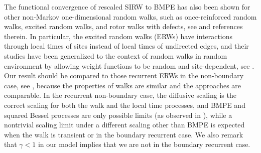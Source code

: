 \documentclass[twoside,12pt, a4paper, final]{article}
\numberwithin{equation}{section}
\theoremstyle{remark}
\newcommand{\comment}[1]{\textcolor{blue}{(Comment: #1)}}
\begin{document}
	
	The functional convergence of rescaled SIRW to BMPE has also been shown for other non-Markov one-dimensional random walks,
	such as once-reinforced random walks, excited random walks, and rotor walks with defects, see \cite{Dav96,Dav99,DK12,KP16,KMP22,HLSH18} and references therein. 
	In particular, the excited random walks (ERWs) have interactions through local times of sites instead of local times of undirected edges, and their studies have been generalized to the context of random walks in random environment by allowing weight functions to be random and site-dependent, 
	see \cite{KZ13, KMP22}.
	Our result should be compared to those recurrent ERWs in the non-boundary case, see \cite{KP16,KMP23}, because the properties of walks are similar and the approaches are comparable. 
	In the recurrent non-boundary case, the diffusive scaling is the correct scaling for both the walk and the local time processes, and BMPE and squared Bessel processes are only possible limits (as observed in \cite{T96}), while a nontrivial scaling limit under a different scaling other than BMPE is expected when the walk is transient or in the boundary recurrent case. We also remark that $\gamma<1$ in our model implies that we are not in the boundary recurrent case.
	
\end{document}
